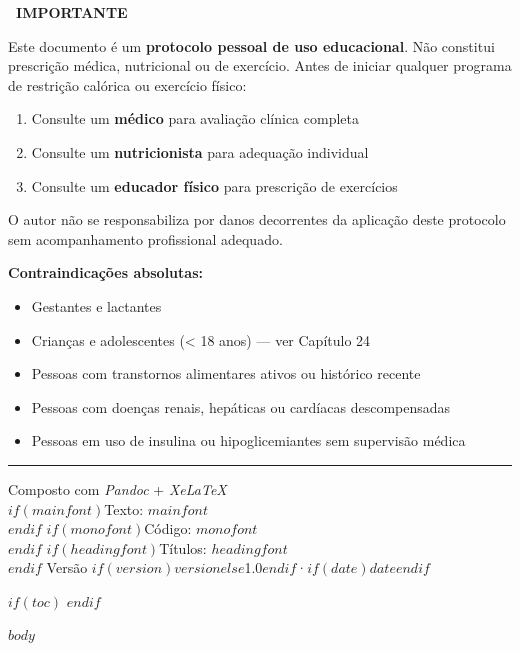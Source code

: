 \documentclass[$if(fontsize)$$fontsize$,$endif$a4paper]{article}
\begin{document}
\begin{queima@alertbox}
\noindent\textbf{\textcolor{red!70!black}{\faExclamationTriangle\ IMPORTANTE}}
\par\smallskip
\noindent Este documento é um \textbf{protocolo pessoal de uso educacional}. Não constitui
prescrição médica, nutricional ou de exercício. Antes de iniciar qualquer programa de
restrição calórica ou exercício físico:

\begin{enumerate}[itemsep=3pt]
  \item Consulte um \textbf{médico} para avaliação clínica completa
  \item Consulte um \textbf{nutricionista} para adequação individual
  \item Consulte um \textbf{educador físico} para prescrição de exercícios
\end{enumerate}

\noindent O autor não se responsabiliza por danos decorrentes da aplicação
deste protocolo sem acompanhamento profissional adequado.
\end{queima@alertbox}

\vspace{1.5cm}

\noindent\textbf{Contraindicações absolutas:}
\begin{itemize}[itemsep=2pt]
  \item Gestantes e lactantes
  \item Crianças e adolescentes (< 18 anos) — ver Capítulo 24
  \item Pessoas com transtornos alimentares ativos ou histórico recente
  \item Pessoas com doenças renais, hepáticas ou cardíacas descompensadas
  \item Pessoas em uso de insulina ou hipoglicemiantes sem supervisão médica
\end{itemize}

\vspace{1.5cm}

\begin{center}
  {\textcolor{AccentFg}{\rule{0.3\linewidth}{0.5pt}}\par}
  \vspace{0.8cm}
  {\small\color{BodyFg}
    Composto com \textit{Pandoc} + \textit{XeLaTeX}\\[3pt]
    $if(mainfont)$Texto: \textit{$mainfont$}\\[3pt]$endif$
    $if(monofont)$Código: \textit{$monofont$}\\[3pt]$endif$
    $if(headingfont)$Títulos: \textit{$headingfont$}\\[3pt]$endif$
    Versão $if(version)$$version$$else$1.0$endif$\enspace·\enspace$if(date)$$date$$endif$
  }
\end{center}

\newpage

$if(toc)$
{
  \hypersetup{linkcolor=BodyFg}
  \tableofcontents
}
\newpage
$endif$

$body$
\end{document}
